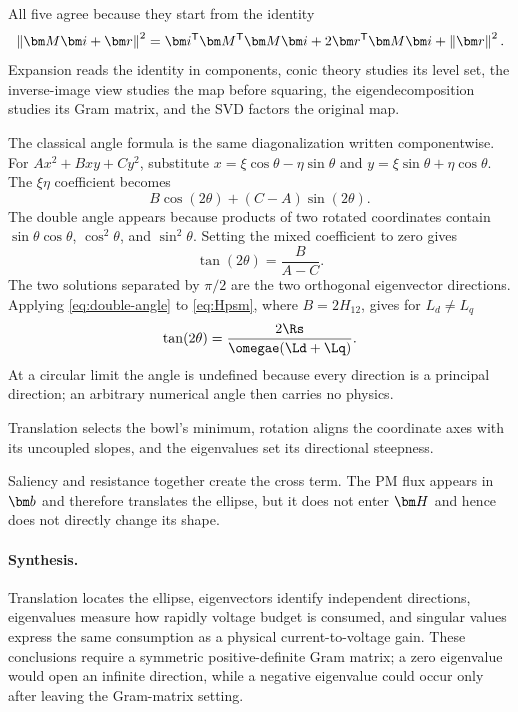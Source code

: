 All five agree because they start from the identity
\begin{equation}
 \norm{\Apsm\current+\vect r}^2
 =\current\trans\Apsm\trans\Apsm\current
  +2\vect r\trans\Apsm\current+\norm{\vect r}^2.
\end{equation}
Expansion reads the identity in components, conic theory studies its level
set, the inverse-image view studies the map before squaring, the
eigendecomposition studies its Gram matrix, and the SVD factors the original
map.




The classical angle formula is the same diagonalization written componentwise.
For $Ax^2+Bxy+Cy^2$, substitute
$x=\xi\cos\theta-\eta\sin\theta$ and
$y=\xi\sin\theta+\eta\cos\theta$.  The $\xi\eta$ coefficient becomes
\begin{equation}
 B\cos(2\theta)+(C-A)\sin(2\theta).
\end{equation}
The double angle appears because products of two rotated coordinates contain
$\sin\theta\cos\theta$, $\cos^2\theta$, and $\sin^2\theta$.  Setting the mixed
coefficient to zero gives
\begin{equation}
 \boxed{\tan(2\theta)=\frac{B}{A-C}.}\label{eq:double-angle}
\end{equation}
The two solutions separated by $\pi/2$ are the two orthogonal eigenvector
directions.  Applying \cref{eq:double-angle} to \cref{eq:Hpsm}, where
$B=2H_{12}$, gives for $L_d\neq L_q$
\begin{equation}
 \tan(2\theta)=\frac{2\Rs}{\omegae(\Ld+\Lq)}.\label{eq:psm-angle}
\end{equation}
At a circular limit the angle is undefined because every direction is a
principal direction; an arbitrary numerical angle then carries no physics.

\geointerpretation Translation selects the bowl's minimum, rotation aligns the
coordinate axes with its uncoupled slopes, and the eigenvalues set its
directional steepness.

\physinterpretation Saliency and resistance together create the cross term.
The PM flux appears in $\vect b$ and therefore translates the ellipse, but it
does not enter $\Hpsm$ and hence does not directly change its shape.

\paragraph{Synthesis.}
Translation locates the ellipse, eigenvectors identify independent directions,
eigenvalues measure how rapidly voltage budget is consumed, and singular
values express the same consumption as a physical current-to-voltage gain.
These conclusions require a symmetric positive-definite Gram matrix; a zero
eigenvalue would open an infinite direction, while a negative eigenvalue could
occur only after leaving the Gram-matrix setting.
